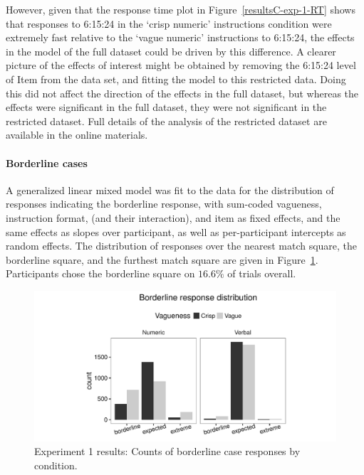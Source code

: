 \documentclass[ %
  graybox       %
 ,envcountchap  %
 ,sectrefs      %
]{svmono}
\begin{document}
However, given that the response time plot in Figure~\ref{resultsC-exp-1-RT} shows that responses to 6:15:24 in the `crisp numeric' instructions condition were extremely fast relative to the `vague numeric' instructions to 6:15:24, the effects in the model of the full dataset could be driven by this difference. A clearer picture of the effects of interest might be obtained by removing the 6:15:24 level of Item from the data set, and fitting the model to this restricted data. Doing this did not affect the direction of the effects in the full dataset, but whereas the effects were significant in the full dataset, they were not significant in the restricted dataset. Full details of the analysis of the restricted dataset are available in the online materials.

\paragraph{\textbf{Borderline cases}}

A generalized linear mixed model \citep{jaeger2008categorical} was fit to the data for the distribution of responses indicating the borderline response, with sum-coded vagueness, instruction format, (and their interaction), and item as fixed effects, and the same effects as slopes over participant, as well as per-participant intercepts as random effects. The distribution of responses over the nearest match square, the borderline square, and the furthest match square are given in Figure~\ref{resultsC-exp-1-BL}. Participants chose the borderline square on $16.6\%$ of trials overall.

\begin{figure}[htbp]
\centering
\includegraphics[width=\textwidth]{figures/Ce1-blBarChart-1}
\caption{Experiment 1 results: Counts of borderline case responses by condition.}
\label{resultsC-exp-1-BL}
\end{figure}
\end{document}
